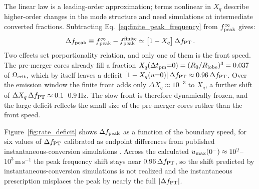 \documentclass[10pt,superscriptaddress,
amsmath,aps,prc,twocolumn,nofootinbib,floatfix]{revtex4-1}
\newcommand{\m}{\text{m}}
\newcommand{\s}{\text{s}}
\begin{document}
{The linear law is a leading-order approximation; terms nonlinear in $X_q$ describe higher-order changes in the mode structure and need simulations at intermediate converted fractions.
Subtracting Eq.~\eqref{eq:finite_peak_frequency} from $f_{\rm peak}^{\infty}$ gives:
\begin{equation}
\Delta f_{\rm peak}
\equiv
f_{\rm peak}^{\infty}-f_{\rm peak}^{\rm finite}
\simeq
\bigl[1-X_q\bigr]\,\Delta f_{\rm PT}\,.
\label{eq:rate_shift}
\end{equation}
Two effects set porportionality relation, and only one of them is the front speed.
The pre-merger cores already fill a fraction $X_q(\Delta t_{\rm pm}{=}0)=(R_0/R_{\rm lobe})^3=0.037$ of $\Omega_{\rm crit}$, which by itself leaves a deficit $[1-X_q(u{=}0)]\,\Delta f_{\rm PT}\approx0.96\,\Delta f_{\rm PT}$.
Over the emission window the finite front adds only $\Delta X_q\approx10^{-3}$ to $X_q$, a further shift of $\Delta X_q\,\Delta f_{\rm PT}\approx0.1$--$0.9\,$Hz.
The slow front is therefore dynamically frozen, and the large deficit reflects the small size of the pre-merger cores rather than the front speed.

Figure~\ref{fig:rate_deficit} shows $\Delta f_{\rm peak}$ as a function of the boundary speed, for six values of $\Delta f_{\rm PT}$ calibrated as endpoint differences from published instantaneous-conversion simulations \cite{Prakash:2023afe,Bauswein:2018bma}.
Across the calculated $u_{\rm max}(0^-)\approx10^{2}$--$10^{3}\,\m\,\s^{-1}$ the peak frequency shift stays near $0.96\,\Delta f_{\rm PT}$, so the shift predicted by instantaneous-conversion simulations is not realized and the instantaneous prescription misplaces the peak by nearly the full $|\Delta f_{\rm PT}|$.

}
\end{document}
